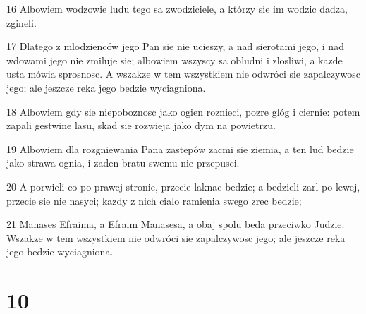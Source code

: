 \par 16 Albowiem wodzowie ludu tego sa zwodziciele, a którzy sie im wodzic dadza, zgineli.
\par 17 Dlatego z mlodzienców jego Pan sie nie ucieszy, a nad sierotami jego, i nad wdowami jego nie zmiluje sie; albowiem wszyscy sa obludni i zlosliwi, a kazde usta mówia sprosnosc. A wszakze w tem wszystkiem nie odwróci sie zapalczywosc jego; ale jeszcze reka jego bedzie wyciagniona.
\par 18 Albowiem gdy sie niepoboznosc jako ogien roznieci, pozre glóg i ciernie: potem zapali gestwine lasu, skad sie rozwieja jako dym na powietrzu.
\par 19 Albowiem dla rozgniewania Pana zastepów zacmi sie ziemia, a ten lud bedzie jako strawa ognia, i zaden bratu swemu nie przepusci.
\par 20 A porwieli co po prawej stronie, przecie laknac bedzie; a bedzieli zarl po lewej, przecie sie nie nasyci; kazdy z nich cialo ramienia swego zrec bedzie;
\par 21 Manases Efraima, a Efraim Manasesa, a obaj spolu beda przeciwko Judzie. Wszakze w tem wszystkiem nie odwróci sie zapalczywosc jego; ale jeszcze reka jego bedzie wyciagniona.

\chapter{10}

